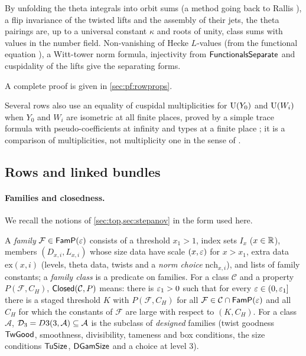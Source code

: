 \begin{proofoutline}
By unfolding the theta integrals into orbit sums (a method going back to Rallis \cite{Rallis1984}), a flip
invariance of the twisted lifts and the assembly of their jets, the theta pairings are, up to a universal
constant $\kappa$ and roots of unity, class sums with values in the number field. Non-vanishing of Hecke
$L$-values (from the functional equation \cite{Tate1967thesis}), a Witt-tower norm formula, injectivity from
$\mathsf{FunctionalsSeparate}$ and cuspidality of the lifts give the separating forms.

A complete proof is given in \cref{sec:pf:rowprops}.
\end{proofoutline}

\begin{remark}\label{rem:families:mult}
Several rows also use an equality of cuspidal multiplicities for $\operatorname{U}(Y_0)$ and $\operatorname{U}(W_i)$ when $Y_0$ and $W_i$
are isometric at all finite places, proved by a simple trace formula with pseudo-coefficients at infinity and
types at a finite place \cite{DeligneKazhdanVigneras1984,Arthur1989,ClozelDelorme1984}; it is a comparison of
multiplicities, not multiplicity one in the sense of \cite{AizenbudGourevitchRallisSchiffmann2010}.
\end{remark}

\subsection{Rows and linked bundles}\label{sec:families:rows}

\paragraph{Families and closedness.}
We recall the notions of \cref{sec:top,sec:stepanov} in the form used here.

\begin{definition}\label{def:families:closed}
A \emph{family} $\mathcal F\in\mathsf{FamP}(\varepsilon)$ consists of a threshold $x_1>1$, index sets $I_x$
($x\in\mathbb{R}$), members $(D_{x,i},L_{x,i})$ whose size data have scale $(x,\varepsilon)$ for $x>x_1$, extra data
$\mathrm{ex}(x,i)$ (levels, theta data, twists and a \emph{norm choice} $\mathrm{nch}_{x,i}$), and lists of
family constants; a \emph{family class} is a predicate on families. For a class $\mathcal C$ and a property
$P(\mathcal F,C_H)$, $\mathsf{Closed}(\mathcal C,P)$ means: there is $\varepsilon_1>0$ such that for every
$\varepsilon\in(0,\varepsilon_1]$ there is a staged threshold $K$ with $P(\mathcal F,C_H)$ for all
$\mathcal F\in\mathcal C\cap\mathsf{FamP}(\varepsilon)$ and all $C_H$ for which the constants of $\mathcal F$ are large
with respect to $(K,C_H)$. For a class $\mathcal A$, $\mathcal{D}_3=D3(3,\mathcal A)\subseteq\mathcal A$ is the
subclass of \emph{designed} families (twist goodness $\mathsf{TwGood}$, smoothness, divisibility, tameness and
box conditions, the size conditions $\mathsf{TuSize}$, $\mathsf{DGamSize}$ and a choice at level $3$).
\end{definition}

